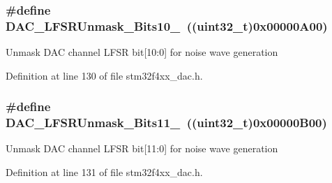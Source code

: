 \hypertarget{group___d_a_c__lfsrunmask__triangleamplitude_ga7670f0e10f062571d0e56027ef653228}{
\subsubsection[{D\-A\-C\-\_\-\-L\-F\-S\-R\-Unmask\-\_\-\-Bits10\-\_\-0}]{\setlength{\rightskip}{0pt plus 5cm}\#define D\-A\-C\-\_\-\-L\-F\-S\-R\-Unmask\-\_\-\-Bits10\-\_~((uint32\-\_\-t)0x00000\-A00)}}\label{group___d_a_c__lfsrunmask__triangleamplitude_ga7670f0e10f062571d0e56027ef653228}
Unmask D\-A\-C channel L\-F\-S\-R bit\mbox{[}10\-:0\mbox{]} for noise wave generation 

Definition at line 130 of file stm32f4xx\-\_\-dac.\-h.

\hypertarget{group___d_a_c__lfsrunmask__triangleamplitude_gaeb9b5992b771f9a14587eeda58227831}{
\subsubsection[{D\-A\-C\-\_\-\-L\-F\-S\-R\-Unmask\-\_\-\-Bits11\-\_\-0}]{\setlength{\rightskip}{0pt plus 5cm}\#define D\-A\-C\-\_\-\-L\-F\-S\-R\-Unmask\-\_\-\-Bits11\-\_~((uint32\-\_\-t)0x00000\-B00)}}\label{group___d_a_c__lfsrunmask__triangleamplitude_gaeb9b5992b771f9a14587eeda58227831}
Unmask D\-A\-C channel L\-F\-S\-R bit\mbox{[}11\-:0\mbox{]} for noise wave generation 

Definition at line 131 of file stm32f4xx\-\_\-dac.\-h.

